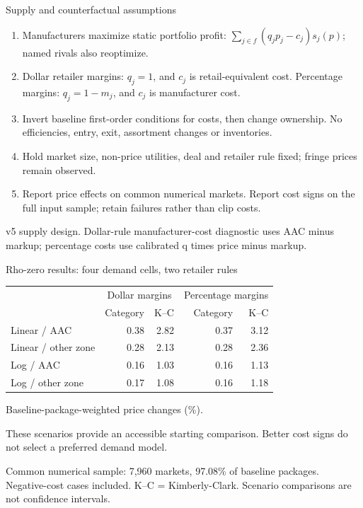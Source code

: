 \documentclass[aspectratio=169,11pt]{beamer}
\newcommand{\source}[1]{\par\vfill{\tiny\color{gray}#1}}
\begin{document}
\begin{frame}{Supply and counterfactual assumptions}
\small
\begin{enumerate}\setlength\itemsep{2.6mm}
\item Manufacturers maximize static portfolio profit: $\sum_{j\in f}(q_jp_j-c_j)s_j(p)$; named rivals also reoptimize.
\item Dollar retailer margins: $q_j=1$, and $c_j$ is retail-equivalent cost. Percentage margins: $q_j=1-m_j$, and $c_j$ is manufacturer cost.
\item Invert baseline first-order conditions for costs, then change ownership. No efficiencies, entry, exit, assortment changes or inventories.
\item Hold market size, non-price utilities, deal and retailer rule fixed; fringe prices remain observed.
\item Report price effects on common numerical markets. Report cost signs on the full input sample; retain failures rather than clip costs.
\end{enumerate}
\source{v5 supply design. Dollar-rule manufacturer-cost diagnostic uses AAC minus markup; percentage costs use calibrated q times price minus markup.}
\end{frame}

\begin{frame}{Rho-zero results: four demand cells, two retailer rules}
\centering\small
\begin{tabular}{lrrrr}\toprule
&\multicolumn{2}{c}{Dollar margins}&\multicolumn{2}{c}{Percentage margins}\\
&Category&K--C&Category&K--C\\\midrule
Linear / AAC & 0.38 & 2.82 & 0.37 & 3.12 \\
Linear / other zone & 0.28 & 2.13 & 0.28 & 2.36 \\
Log / AAC & 0.16 & 1.03 & 0.16 & 1.13 \\
Log / other zone & 0.17 & 1.08 & 0.16 & 1.18 \\
\bottomrule\end{tabular}
\par\medskip\normalsize
Baseline-package-weighted price changes (\%).\par\medskip
These scenarios provide an accessible starting comparison. Better cost signs do not select a preferred demand model.
\source{Common numerical sample: 7,960 markets, 97.08\% of baseline packages. Negative-cost cases included. K--C = Kimberly-Clark. Scenario comparisons are not confidence intervals.}
\end{frame}
\end{document}

